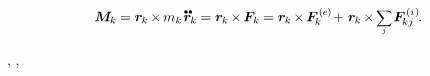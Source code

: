 \nopagebreak\vspace{-0.3em}
\begin{equation}\label{momentactingonparticle}
\bm{M}_{\hspace{-0.1ex}k} \hspace{-0.1ex}
= \locationvector_{\hspace{-0.1ex}k} \hspace{-0.2ex} \times \hspace{-0.2ex} m_k \hspace{.2ex} \mathdotdotabove{\locationvector}_{\hspace{-0.1ex}k} \hspace{-0.1ex}
= \locationvector_{\hspace{-0.1ex}k} \hspace{-0.2ex} \times \hspace{-0.2ex} \bm{F}_k \hspace{-0.1ex}
= \locationvector_{\hspace{-0.1ex}k} \hspace{-0.2ex} \times \hspace{-0.2ex} \bm{F}^{\smthexternal}_{\hspace{-0.16ex}k}
\hspace{-0.2ex} + \hspace{.1ex}
\locationvector_{\hspace{-0.1ex}k} \hspace{-0.2ex} \times \hspace{-0.2ex} \scalebox{.8}{$ \displaystyle \underset{\raisemath{.25ex}{\smash{j}}}{\sum} $} \hspace{.2ex} \bm{F}^{\smthinternal}_{\hspace{-0.16ex}kj}
\hspace{-0.1ex} .
\end{equation}

\vspace{-0.6em}\noindent
{}
,
,


